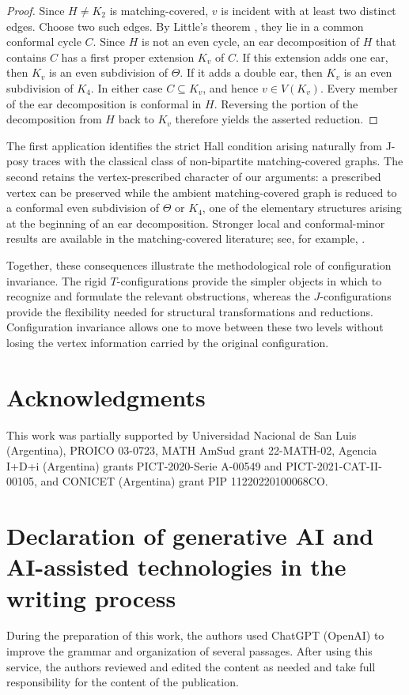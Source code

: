 \documentclass[preprint,12pt]{elsarticle}
\theoremstyle{plain}
\begin{document}
\begin{proof}
Since \(H\neq K_2\) is matching-covered, \(v\) is incident with at least
two distinct edges.  Choose two such edges.  By Little's theorem
\cite{little1974factorcovered}, they lie in a common conformal cycle \(C\).
Since \(H\) is not an even cycle, an ear decomposition of \(H\) that contains
\(C\) has a first proper extension \(K_v\) of \(C\).  If this extension adds
one ear, then \(K_v\) is an even subdivision of \(\Theta\).  If it adds a
double ear, then \(K_v\) is an even subdivision of \(K_4\).  In either case
\(C\subseteq K_v\), and hence \(v\in V(K_v)\).  Every member of the ear
decomposition is conformal in \(H\). Reversing the portion of the decomposition
from \(H\) back to \(K_v\) therefore yields the asserted reduction.
\end{proof}

The first application identifies the strict Hall condition arising naturally
from J-posy traces with the classical class of non-bipartite matching-covered
graphs.  The second retains the vertex-prescribed character of our arguments:
a prescribed vertex can be preserved while the ambient matching-covered graph
is reduced to a conformal even subdivision of \(\Theta\) or \(K_4\), one of the
elementary structures arising at the beginning of an ear decomposition.
Stronger local and conformal-minor results are available in the
matching-covered literature; see, for example, \cite{kothari2026cubic}.

Together, these consequences illustrate the methodological role of
configuration invariance.  The rigid \(T\)-configurations provide the simpler
objects in which to recognize and formulate the relevant obstructions,
whereas the \(J\)-configurations provide the flexibility needed for structural
transformations and reductions.  Configuration invariance allows one to move
between these two levels without losing the vertex information carried by the
original configuration.

\section*{Acknowledgments}
This work was partially supported by Universidad Nacional de San Luis
(Argentina), PROICO 03-0723, MATH AmSud grant 22-MATH-02, Agencia I+D+i
(Argentina) grants PICT-2020-Serie A-00549 and PICT-2021-CAT-II-00105, and
CONICET (Argentina) grant PIP 11220220100068CO\@.

\section*{Declaration of generative AI and AI-assisted technologies in the writing process}
During the preparation of this work, the authors used ChatGPT (OpenAI) to improve the grammar and organization of several passages. After using this service, the authors reviewed and edited the content as needed and take full responsibility for the content of the publication.
\end{document}

